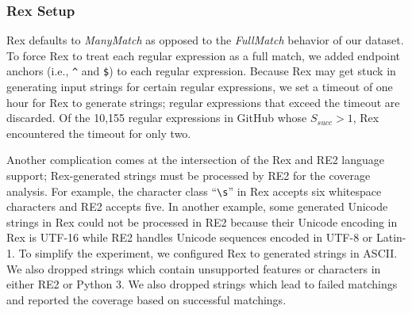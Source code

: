 




\subsubsection{Rex Setup}
Rex defaults 
to \emph{ManyMatch} as opposed to the \emph{FullMatch} behavior of our dataset. 
To force Rex to treat each regular expression as a full match, we added endpoint anchors (i.e., \verb!^! and \verb!$!) to each regular expression. 
Because Rex may get stuck in generating input strings for certain regular expressions, we set a timeout of one hour for Rex to generate strings; regular expressions that exceed the timeout are discarded. %
Of the 10,155 regular expressions in GitHub whose $S_{succ}>1$, Rex encountered the timeout for only two. %
 
 Another complication comes at the intersection of the Rex and RE2 language support; Rex-generated strings must be processed by RE2 for the coverage analysis. 
For example, the character class ``\verb!\s!'' in Rex accepts six whitespace characters and RE2 accepts five.  In another example, some generated Unicode strings in Rex could not be processed in RE2 because their Unicode encoding in Rex is UTF-16 while RE2 handles Unicode sequences encoded in UTF-8 or Latin-1. 
To simplify the experiment, we configured Rex to generated strings in ASCII. We also dropped strings which contain unsupported features or characters in either RE2 or Python 3. We also dropped strings which lead to failed matchings and reported the coverage based on successful matchings.


